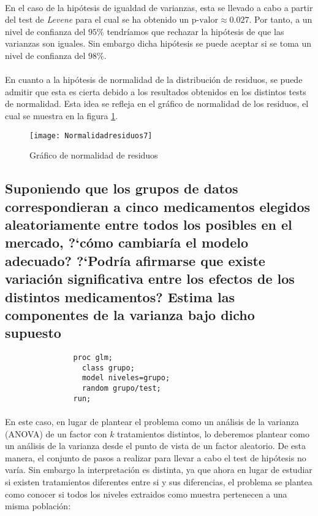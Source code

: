 \documentclass{article}
\begin{document}
      \paragraph{}
      En el caso de la hipótesis de igualdad de varianzas, esta se llevado a cabo a partir del test de \emph{Levene} para el cual se ha obtenido un $\text{p-valor} \approx 0.027$. Por tanto, a un nivel de confianza del $95\%$ tendríamos que rechazar la hipótesis de que las varianzas son iguales. Sin embargo dicha hipótesis se puede aceptar si se toma un nivel de confianza del $98\%$.

      \paragraph{}
      En cuanto a la hipótesis de normalidad de la distribución de residuos, se puede admitir que esta es cierta debido a los resultados obtenidos en los distintos tests de normalidad. Esta idea se refleja en el gráfico de normalidad de los residuos, el cual se muestra en la figura \ref{fig:figura_2}.

      \begin{figure}[H]
        \centering
        \texttt{[image: Normalidadresiduos7]}
        \caption{Gráfico de normalidad de residuos}
        \label{fig:figura_2}
      \end{figure}



    \subsection{Suponiendo que los grupos de datos correspondieran a cinco medicamentos elegidos aleatoriamente entre todos los posibles en el mercado, ?`cómo cambiaría el modelo adecuado? ?`Podría afirmarse que existe variación significativa entre los efectos de los distintos medicamentos? Estima las componentes de la varianza bajo dicho supuesto}


      \begin{figure}[h]
        \centering
        \begin{verbatim}
          proc glm;
            class grupo;
            model niveles=grupo;
            random grupo/test;
          run;
        \end{verbatim}
        \label{code:sas_8}
      \end{figure}

      \paragraph{}
      En este caso, en lugar de plantear el problema como un análisis de la varianza (ANOVA) de un factor con $k$ tratamientos distintos, lo deberemos plantear como un análisis de la varianza desde el punto de vista de un factor aleatorio. De esta manera, el conjunto de pasos a realizar para llevar a cabo el test de hipótesis no varía. Sin embargo la interpretación es distinta, ya que ahora en lugar de estudiar si existen tratamientos diferentes entre si y sus diferencias, el problema se plantea como conocer si todos los niveles extraidos como muestra pertenecen a una misma población:
\end{document}
